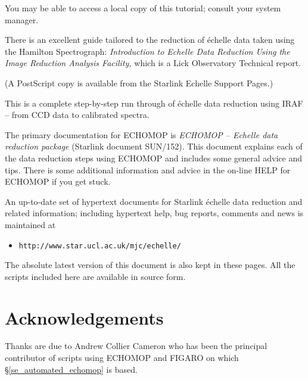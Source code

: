 \documentclass[twoside,11pt]{article}
\newcommand{\stardocinitials}  {SC}
\newcommand{\stardocnumber}    {3.2-0} %
\newcommand{\stardocname}{\stardocinitials /\stardocnumber}
\newcommand{\htmladdnormallink}[2]{#1}
\newcommand{\htmlref}[2]{#1}
\newcommand{\xref}[3]{#1}
\newcommand{\xlabel}[1]{}
\newcommand{\scspec}[2]{#1}
\newcommand{\scspec}[2]{#2}
\newcommand{\EchelleHomePage}{http://www.starlink.ac.uk/echomop/echelle/}
\begin{document}
You may be able to access a local copy of this tutorial; consult your
system manager.

There is an excellent guide tailored to the reduction of \'{e}chelle
data taken using the Hamilton Spectrograph:
\htmladdnormallink{{\sl Introduction to Echelle
Data Reduction  Using the Image Reduction Analysis Facility,}}
{\EchelleHomePage/misc/LickTech74.ps.gz}
which is a
Lick Observatory Technical report\@.
\begin{latex}
(A PostScript copy is available from the Starlink Echelle Support
Pages.)
\end{latex}
This is a complete
step-by-step run through of \'{e}chelle data reduction using IRAF
\scspec{--}{-} from CCD data to calibrated spectra.

The primary documentation for ECHOMOP is \xref{{\sl ECHOMOP
\scspec{--}{-} Echelle
data reduction package} (Starlink document SUN/152)}{sun152}{}\@.
This document explains each of the data reduction steps using ECHOMOP and
includes some general advice and tips.
There is some additional information and advice in the on-line HELP for
ECHOMOP if you get stuck.

An up-to-date set of hypertext documents for Starlink \'{e}chelle data
reduction and related information; including hypertext help, bug
reports, comments and news is maintained at

\begin{itemize}

\item \scspec{{\tt http://www.star.ucl.ac.uk/mjc/echelle/}}
      {\htmladdnormallink{\verb+http://www.star.ucl.ac.uk/~mjc/echelle/+}
      {http://www.star.ucl.ac.uk/~mjc/echelle/}}

\end{itemize}

The absolute latest version of this document is also kept in these pages.
All the scripts included here are available in source form.


\section{\label{se_acknowledgements}\xlabel{acknowledgements}Acknowledgements }
\markboth{Acknowledgements}{\stardocname}

Thanks are due to Andrew Collier Cameron who has been the principal
contributor of scripts using ECHOMOP and FIGARO on which
\scspec{\S\ref{se_automated_echomop} is}
{the \htmlref{automated reductions}{se_automated_echomop} are}
based.
\end{document}
